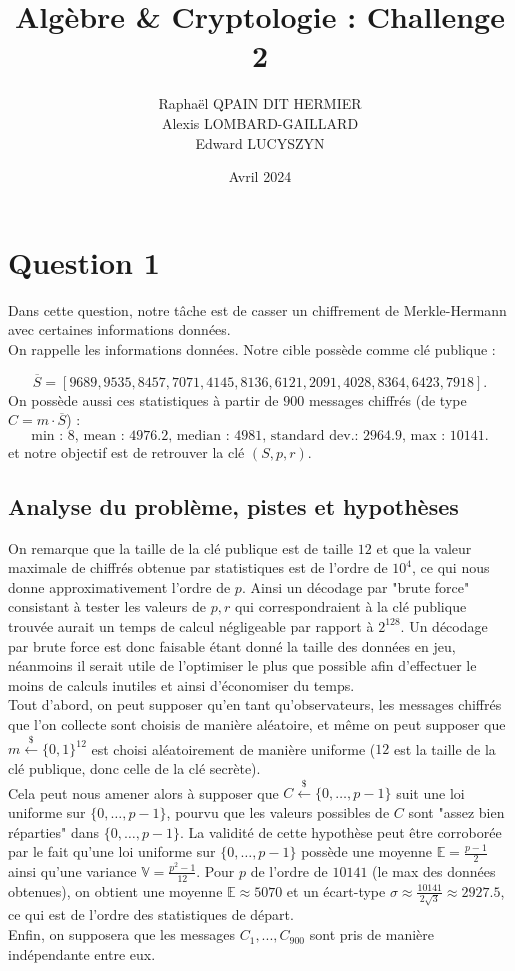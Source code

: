 \documentclass{article}
\title{Algèbre \& Cryptologie : Challenge 2}
\author{Raphaël QPAIN DIT HERMIER\\
Alexis LOMBARD-GAILLARD\\
Edward LUCYSZYN}
\date{Avril 2024}
\begin{document}


\tableofcontents

\newpage
\section{Question 1}

Dans cette question, notre tâche est de casser un chiffrement de Merkle-Hermann avec certaines informations données.\\

On rappelle les informations données. Notre cible possède comme clé publique :

\[\overline{S} = [9689, 9535, 8457, 7071, 4145, 8136, 6121, 2091, 4028, 8364, 6423, 7918].\]
On possède aussi ces statistiques à partir de $900$ messages chiffrés (de type $C = m\cdot \overline{S}$) :
\[\text{min : } 8\text{, mean : }4976.2\text{, median : }4981\text{, standard dev.: }2964.9\text{, max : }10141.\]
et notre objectif est de retrouver la clé $(S,p,r)$.

\subsection{Analyse du problème, pistes et hypothèses}

On remarque que la taille de la clé publique est de taille $12$ et que la valeur maximale de chiffrés obtenue par statistiques est de l'ordre de $10^4$, ce qui nous donne approximativement l'ordre de $p$. Ainsi un décodage par "brute force" consistant à tester les valeurs de $p,r$ qui correspondraient à la clé publique trouvée aurait un temps de calcul négligeable par rapport à $2^{128}$. Un décodage par brute force est donc faisable étant donné la taille des données en jeu, néanmoins il serait utile de l'optimiser le plus que possible afin d'effectuer le moins de calculs inutiles et ainsi d'économiser du temps.\\

Tout d'abord, on peut supposer qu'en tant qu'observateurs, les messages chiffrés que l'on collecte sont choisis de manière aléatoire, et même on peut supposer que $\displaystyle m\xleftarrow{\$}\{0,1\}^{12}$ est choisi aléatoirement de manière uniforme ($12$ est la taille de la clé publique, donc celle de la clé secrète).\\
Cela peut nous amener alors à supposer que $\displaystyle C\xleftarrow{\$}\{0,\dots,p-1\}$ suit une loi uniforme sur $\{0,\dots,p-1\}$, pourvu que les valeurs possibles de $C$ sont "assez bien réparties" dans $\{0,\dots,p-1\}$. La validité de cette hypothèse peut être corroborée par le fait qu'une loi uniforme sur $\{0,\dots,p-1\}$ possède une moyenne $\displaystyle\mathbb{E} = \frac{p-1}{2}$ ainsi qu'une variance $\displaystyle\mathbb{V} = \frac{p^2-1}{12}$. Pour $p$ de l'ordre de $10141$ (le max des données obtenues), on obtient une moyenne $\displaystyle\mathbb{E} \approx 5070$ et un écart-type $\displaystyle\sigma \approx \frac{10141}{2\sqrt{3}} \approx 2927.5$, ce qui est de l'ordre des statistiques de départ.\\
Enfin, on supposera que les messages $C_1,...,C_{900}$ sont pris de manière indépendante entre eux.\\
\end{document}
